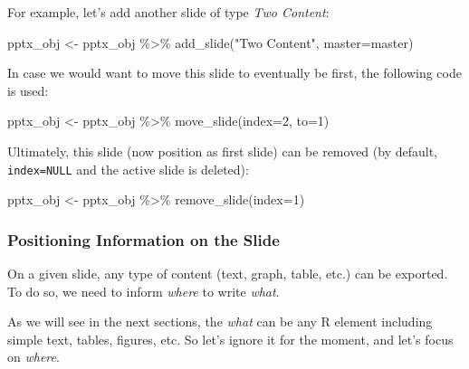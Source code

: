\documentclass[
]{krantz}
\makeatletter
\newenvironment{Shaded}{\begin{snugshade}}{\end{snugshade}}
\newcommand{\AttributeTok}[1]{\textcolor[rgb]{0.61,0.61,0.61}{#1}}
\newcommand{\DecValTok}[1]{\textcolor[rgb]{0.06,0.06,0.06}{#1}}
\newcommand{\FunctionTok}[1]{\textcolor[rgb]{0,0,0}{#1}}
\newcommand{\NormalTok}[1]{#1}
\newcommand{\OtherTok}[1]{\textcolor[rgb]{0.37,0.37,0.37}{#1}}
\newcommand{\SpecialCharTok}[1]{\textcolor[rgb]{0,0,0}{#1}}
\newcommand{\StringTok}[1]{\textcolor[rgb]{0.5,0.5,0.5}{#1}}
\newenvironment{kframe}{%
\medskip{}
\setlength{\fboxsep}{.8em}
 \def\at@end@of@kframe{}%
 \ifinner\ifhmode%
  \def\at@end@of@kframe{\end{minipage}}%
  \begin{minipage}{\columnwidth}%
 \fi\fi%
 \def\FrameCommand##1{\hskip\@totalleftmargin \hskip-\fboxsep
 \colorbox{shadecolor}{##1}\hskip-\fboxsep
     \hskip-\linewidth \hskip-\@totalleftmargin \hskip\columnwidth}%
 \MakeFramed {\advance\hsize-\width
   \@totalleftmargin\z@ \linewidth\hsize
   \@setminipage}}%
 {\par\unskip\endMakeFramed%
 \at@end@of@kframe}
\renewenvironment{Shaded}{\begin{kframe}}{\end{kframe}}
\makeatother
\begin{document}
For example, let's add another slide of type \emph{Two Content}:

\begin{Shaded}
\begin{Highlighting}[]
\NormalTok{pptx\_obj }\OtherTok{\textless{}{-}}\NormalTok{ pptx\_obj }\SpecialCharTok{\%\textgreater{}\%} 
  \FunctionTok{add\_slide}\NormalTok{(}\StringTok{"Two Content"}\NormalTok{, }\AttributeTok{master=}\NormalTok{master)}
\end{Highlighting}
\end{Shaded}

In case we would want to move this slide to eventually be first, the following code is used:

\begin{Shaded}
\begin{Highlighting}[]
\NormalTok{pptx\_obj }\OtherTok{\textless{}{-}}\NormalTok{ pptx\_obj }\SpecialCharTok{\%\textgreater{}\%} 
  \FunctionTok{move\_slide}\NormalTok{(}\AttributeTok{index=}\DecValTok{2}\NormalTok{, }\AttributeTok{to=}\DecValTok{1}\NormalTok{)}
\end{Highlighting}
\end{Shaded}

Ultimately, this slide (now position as first slide) can be removed (by default, \texttt{index=NULL} and the active slide is deleted):

\begin{Shaded}
\begin{Highlighting}[]
\NormalTok{pptx\_obj }\OtherTok{\textless{}{-}}\NormalTok{ pptx\_obj }\SpecialCharTok{\%\textgreater{}\%} 
  \FunctionTok{remove\_slide}\NormalTok{(}\AttributeTok{index=}\DecValTok{1}\NormalTok{)}
\end{Highlighting}
\end{Shaded}

\hypertarget{positioning-information-on-the-slide}{%
\subsubsection{Positioning Information on the Slide}\label{positioning-information-on-the-slide}}

On a given slide, any type of content (text, graph, table, etc.) can be exported. To do so, we need to inform \emph{where} to write \emph{what}.

As we will see in the next sections, the \emph{what} can be any R element including simple text, tables, figures, etc. So let's ignore it for the moment, and let's focus on \emph{where}.
\end{document}
